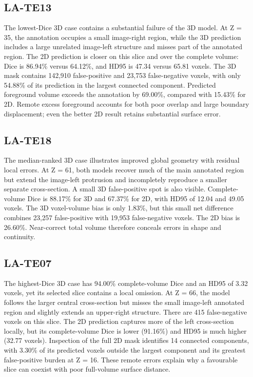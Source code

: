\documentclass[11pt,a4paper]{article}
\begin{document}
\subsection*{LA-TE13}

The lowest-Dice 3D case contains a substantial failure of the 3D model. At Z = 35, the annotation occupies a small image-right region, while the 3D prediction includes a large unrelated image-left structure and misses part of the annotated region. The 2D prediction is closer on this slice and over the complete volume: Dice is 86.94\% versus 64.12\%, and HD95 is 47.34 versus 65.81 voxels. The 3D mask contains 142,910 false-positive and 23,753 false-negative voxels, with only 54.88\% of its prediction in the largest connected component. Predicted foreground volume exceeds the annotation by 69.00\%, compared with 15.43\% for 2D. Remote excess foreground accounts for both poor overlap and large boundary displacement; even the better 2D result retains substantial surface error.



\subsection*{LA-TE18}

The median-ranked 3D case illustrates improved global geometry with residual local errors. At Z = 61, both models recover much of the main annotated region but extend the image-left protrusion and incompletely reproduce a smaller separate cross-section. A small 3D false-positive spot is also visible. Complete-volume Dice is 88.17\% for 3D and 67.37\% for 2D, with HD95 of 12.04 and 49.05 voxels. The 3D voxel-volume bias is only 1.83\%, but this small net difference combines 23,257 false-positive with 19,953 false-negative voxels. The 2D bias is 26.60\%. Near-correct total volume therefore conceals errors in shape and continuity.



\subsection*{LA-TE07}

The highest-Dice 3D case has 94.00\% complete-volume Dice and an HD95 of 3.32 voxels, yet its selected slice contains a local omission. At Z = 66, the model follows the larger central cross-section but misses the small image-left annotated region and slightly extends an upper-right structure. There are 415 false-negative voxels on this slice. The 2D prediction captures more of the left cross-section locally, but its complete-volume Dice is lower (91.16\%) and HD95 is much higher (32.77 voxels). Inspection of the full 2D mask identifies 14 connected components, with 3.30\% of its predicted voxels outside the largest component and its greatest false-positive burden at Z = 16. These remote errors explain why a favourable slice can coexist with poor full-volume surface distance.
\end{document}
